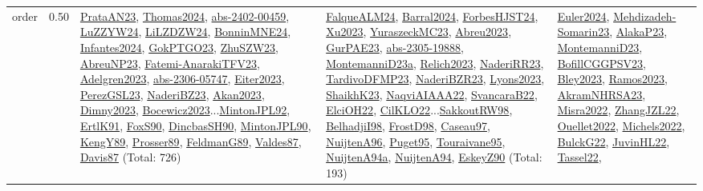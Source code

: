 {\begin{longtable}{p{3cm}r>{\raggedright\arraybackslash}p{6cm}>{\raggedright\arraybackslash}p{6cm}>{\raggedright\arraybackslash}p{8cm}}
\index{order}\index{Scheduling!order}order &  0.50 & \hyperref[detail:PrataAN23]{PrataAN23}, \hyperref[detail:Thomas2024]{Thomas2024}, \hyperref[detail:abs-2402-00459]{abs-2402-00459}, \hyperref[detail:LuZZYW24]{LuZZYW24}, \hyperref[detail:LiLZDZW24]{LiLZDZW24}, \hyperref[detail:BonninMNE24]{BonninMNE24}, \hyperref[detail:Infantes2024]{Infantes2024}, \hyperref[detail:GokPTGO23]{GokPTGO23}, \hyperref[detail:ZhuSZW23]{ZhuSZW23}, \hyperref[detail:AbreuNP23]{AbreuNP23}, \hyperref[detail:Fatemi-AnarakiTFV23]{Fatemi-AnarakiTFV23}, \hyperref[detail:Adelgren2023]{Adelgren2023}, \hyperref[detail:abs-2306-05747]{abs-2306-05747}, \hyperref[detail:Eiter2023]{Eiter2023}, \hyperref[detail:PerezGSL23]{PerezGSL23}, \hyperref[detail:NaderiBZ23]{NaderiBZ23}, \hyperref[detail:Akan2023]{Akan2023}, \hyperref[detail:Dimny2023]{Dimny2023}, \hyperref[detail:Bocewicz2023]{Bocewicz2023}...\hyperref[detail:MintonJPL92]{MintonJPL92}, \hyperref[detail:ErtlK91]{ErtlK91}, \hyperref[detail:FoxS90]{FoxS90}, \hyperref[detail:DincbasSH90]{DincbasSH90}, \hyperref[detail:MintonJPL90]{MintonJPL90}, \hyperref[detail:KengY89]{KengY89}, \hyperref[detail:Prosser89]{Prosser89}, \hyperref[detail:FeldmanG89]{FeldmanG89}, \hyperref[detail:Valdes87]{Valdes87}, \hyperref[detail:Davis87]{Davis87} (Total: 726) & \hyperref[detail:FalqueALM24]{FalqueALM24}, \hyperref[detail:Barral2024]{Barral2024}, \hyperref[detail:ForbesHJST24]{ForbesHJST24}, \hyperref[detail:Xu2023]{Xu2023}, \hyperref[detail:YuraszeckMC23]{YuraszeckMC23}, \hyperref[detail:Abreu2023]{Abreu2023}, \hyperref[detail:GurPAE23]{GurPAE23}, \hyperref[detail:abs-2305-19888]{abs-2305-19888}, \hyperref[detail:MontemanniD23a]{MontemanniD23a}, \hyperref[detail:Relich2023]{Relich2023}, \hyperref[detail:NaderiRR23]{NaderiRR23}, \hyperref[detail:TardivoDFMP23]{TardivoDFMP23}, \hyperref[detail:NaderiBZR23]{NaderiBZR23}, \hyperref[detail:Lyons2023]{Lyons2023}, \hyperref[detail:ShaikhK23]{ShaikhK23}, \hyperref[detail:NaqviAIAAA22]{NaqviAIAAA22}, \hyperref[detail:SvancaraB22]{SvancaraB22}, \hyperref[detail:ElciOH22]{ElciOH22}, \hyperref[detail:CilKLO22]{CilKLO22}...\hyperref[detail:SakkoutRW98]{SakkoutRW98}, \hyperref[detail:BelhadjiI98]{BelhadjiI98}, \hyperref[detail:FrostD98]{FrostD98}, \hyperref[detail:Caseau97]{Caseau97}, \hyperref[detail:NuijtenA96]{NuijtenA96}, \hyperref[detail:Puget95]{Puget95}, \hyperref[detail:Touraivane95]{Touraivane95}, \hyperref[detail:NuijtenA94a]{NuijtenA94a}, \hyperref[detail:NuijtenA94]{NuijtenA94}, \hyperref[detail:EskeyZ90]{EskeyZ90} (Total: 193) & \hyperref[detail:Euler2024]{Euler2024}, \hyperref[detail:Mehdizadeh-Somarin23]{Mehdizadeh-Somarin23}, \hyperref[detail:AlakaP23]{AlakaP23}, \hyperref[detail:MontemanniD23]{MontemanniD23}, \hyperref[detail:BofillCGGPSV23]{BofillCGGPSV23}, \hyperref[detail:Bley2023]{Bley2023}, \hyperref[detail:Ramos2023]{Ramos2023}, \hyperref[detail:AkramNHRSA23]{AkramNHRSA23}, \hyperref[detail:Misra2022]{Misra2022}, \hyperref[detail:ZhangJZL22]{ZhangJZL22}, \hyperref[detail:Ouellet2022]{Ouellet2022}, \hyperref[detail:Michels2022]{Michels2022}, \hyperref[detail:BulckG22]{BulckG22}, \hyperref[detail:JuvinHL22]{JuvinHL22}, \hyperref[detail:Tassel22]{Tassel22}, 
\end{longtable}}
